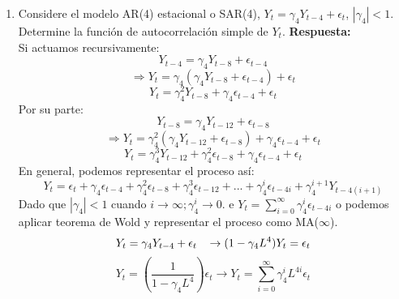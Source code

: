 \documentclass[12pt,letterpaper]{article}
\begin{document}
\begin{enumerate}
\item Considere el modelo AR(4) estacional o SAR(4), $Y_t = \gamma_4Y_{t-4}+\epsilon_t$, \hspace{3mm}$|\gamma_4|<1$. Determine la función de autocorrelación simple de $Y_t$.
    \newline
    \textbf{Respuesta:}
    \\
    Si actuamos recursivamente:
    \begin{equation*}
        Y_{t-4} = \gamma_4Y_{t-8}+\epsilon_{t-4}
    \end{equation*}
    \begin{equation*}
        \Rightarrow Y_t = \gamma_4(\gamma_4Y_{t-8}+\epsilon_{t-4})+\epsilon_t
    \end{equation*}
    \begin{equation*}
        Y_t = \gamma^2_4Y_{t-8}+\gamma_4\epsilon_{t-4}+\epsilon_t
    \end{equation*}
    Por su parte:
    \begin{equation*}
        Y_{t-8} = \gamma_4Y_{t-12}+ \epsilon_{t-8}
    \end{equation*}
    \begin{equation*}
        \Rightarrow Y_t = \gamma_4^2 (\gamma_4Y_{t-12}+\epsilon_{t-8})+ \gamma_4\epsilon_{t-4}+\epsilon_t
    \end{equation*}
    \begin{equation*}
        Y_t = \gamma^3_4 Y_{t-12}+\gamma_4^2\epsilon_{t-8}+\gamma_4\epsilon_{t-4}+\epsilon_t
    \end{equation*}
    En general, podemos representar el proceso así:
    \begin{equation*}
        Y_t = \epsilon_t+\gamma_4\epsilon_{t-4}+\gamma_4^2\epsilon_{t-8}+\gamma^3_4\epsilon_{t-12}+...+\gamma_4^i\epsilon_{t-4i}+\gamma_4^{i+1}Y_{t-4(i+1)}
    \end{equation*}
    Dado que $|\gamma_4|<1$ cuando $i \rightarrow \infty ; \gamma_4^i\rightarrow 0$. e $Y_t = \sum_{i=0}^\infty \gamma_4^i\epsilon_{t-4i}$
    o podemos aplicar teorema de Wold y representar el proceso como MA($\infty$).
    \begin{equation*}
        Y_t = \gamma_4Y_{t-4}+\epsilon_t \hspace{3mm}\rightarrow (1-\gamma_4L^4)Y_t= \epsilon_t
    \end{equation*}
    \begin{equation*}
        Y_t = \left( \frac{1}{1-\gamma_4L^4}\right)\epsilon_t \rightarrow Y_t = \sum_{i=0}^{\infty}\gamma_4^iL^{4i}\epsilon_t

\end{equation*}
\end{enumerate}
\end{document}
